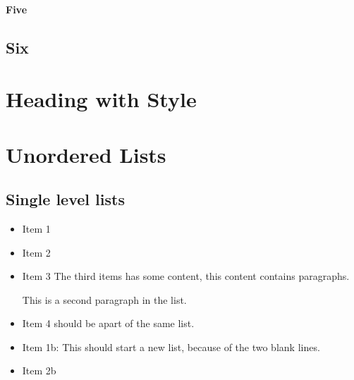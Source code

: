 \paragraph{\label{five}Five}
\subsection{\label{six}Six}
\section{\label{heading-with-style}Heading with Style}
\section{\label{unordered-lists}Unordered Lists}
\subsection{\label{unordered-single-level-lists}Single level lists}
\begin{itemize}
\item 
\par Item 1 
\item 
\par Item 2 
\item 
\par Item 3 The third items has some content, this content contains paragraphs.
\par This is a second paragraph in the list.
\par 
\item 
\par Item 4 should be apart of the same list.
\end{itemize}

\begin{itemize}
\item 
\par Item 1b: This should start a new list, because of the two blank lines. 
\item 
\par Item 2b
\end{itemize}

